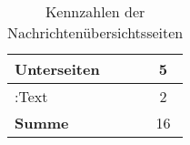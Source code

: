 \begin{table}[htb]
\begin{subtable}[c]{0.5\textwidth}
\begin{tabular}{|l|c|}
                Unterseiten     & 5                                    \\ \hline
                :Text           & 2                                    \\ \hline
                \textbf{Summe}  & 16                                   \\ \hline
                \end{tabular}
            \label{table:findingsNewsFiguresSharedNodes}
        \end{subtable}
        \label{table:findingsNewsFigures}
        \caption{Kennzahlen der Nachrichtenübersichtsseiten}
    \end{table}